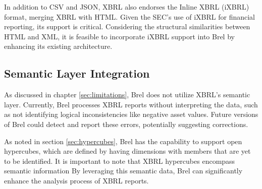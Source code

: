 In addition to CSV and JSON, XBRL also endorses the Inline XBRL (iXBRL) format, merging XBRL with HTML.
Given the SEC's use of iXBRL for financial reporting, its support is critical.
Considering the structural similarities between HTML and XML, it is feasible to incorporate iXBRL support into Brel by enhancing its existing architecture.



\subsection{Semantic Layer Integration}

As discussed in chapter \ref{sec:limitations}, Brel does not utilize XBRL's semantic layer.
Currently, Brel processes XBRL reports without interpreting the data, such as not identifying logical inconsistencies like negative asset values.
Future versions of Brel could detect and report these errors, potentially suggesting corrections.

As noted in section \ref{sec:hypercubes}, Brel has the capability to support open hypercubes,
which are defined by having dimensions with members that are yet to be identified.
It is important to note that XBRL hypercubes encompass semantic information\cite{xbrl_dimensions_technical_considerations}
By leveraging this semantic data, Brel can significantly enhance the analysis process of XBRL reports.

